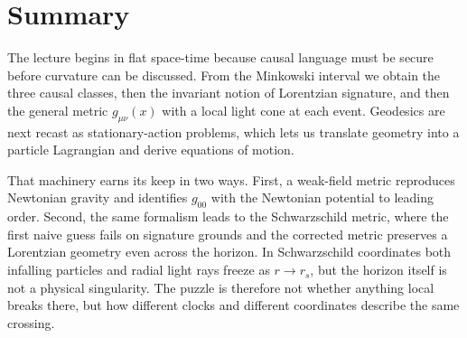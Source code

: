 \section{Summary}

The lecture begins in flat space-time because causal language must be secure before curvature can be discussed. From the Minkowski interval we obtain the three causal classes, then the invariant notion of Lorentzian signature, and then the general metric \(g_{\mu\nu}(x)\) with a local light cone at each event. Geodesics are next recast as stationary-action problems, which lets us translate geometry into a particle Lagrangian and derive equations of motion.

That machinery earns its keep in two ways. First, a weak-field metric reproduces Newtonian gravity and identifies \(g_{00}\) with the Newtonian potential to leading order. Second, the same formalism leads to the Schwarzschild metric, where the first naive guess fails on signature grounds and the corrected metric preserves a Lorentzian geometry even across the horizon. In Schwarzschild coordinates both infalling particles and radial light rays freeze as \(r\to r_s\), but the horizon itself is not a physical singularity. The puzzle is therefore not whether anything local breaks there, but how different clocks and different coordinates describe the same crossing.